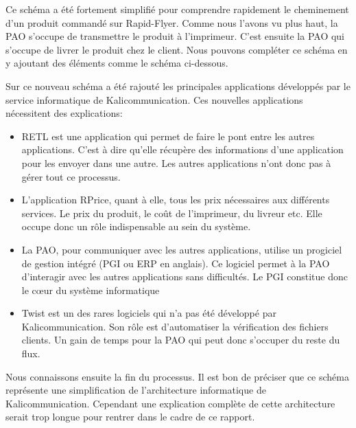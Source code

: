

Ce schéma a été fortement simplifié pour comprendre rapidement le cheminement d'un produit commandé sur Rapid-Flyer. Comme nous l'avons vu plus haut, la PAO s'occupe de transmettre le produit à l'imprimeur. C'est ensuite la PAO qui s'occupe de livrer le produit chez le client. Nous pouvons compléter ce schéma en y ajoutant des éléments comme le schéma ci-dessous.



Sur ce nouveau schéma a été rajouté les principales applications développés par le service informatique de Kalicommunication. Ces nouvelles applications nécessitent des explications:
\begin{itemize}
\item RETL est une application qui permet de faire le pont entre les autres applications. C'est à dire qu'elle récupère des informations d'une application pour les envoyer dans une autre. Les autres applications n'ont donc pas à gérer tout ce processus.
\item L'application RPrice, quant à elle, tous les prix nécessaires aux différents services. Le prix du produit, le coût de l'imprimeur, du livreur etc. Elle occupe donc un rôle indispensable au sein du système.
\item La PAO, pour communiquer avec les autres applications, utilise un progiciel de gestion intégré (PGI ou ERP en anglais). Ce logiciel permet à la PAO d'interagir avec les autres applications sans difficultés. Le PGI constitue donc le cœur du système informatique
\item Twist est un des rares logiciels qui n'a pas été développé par Kalicommunication. Son rôle est d'automatiser la vérification des fichiers clients. Un gain de temps pour la PAO qui peut donc s'occuper du reste du flux.\newline
\end{itemize}
Nous connaissons ensuite la fin du processus. Il est bon de préciser que ce schéma représente une simplification de l'architecture informatique de Kalicommunication. Cependant une explication complète de cette architecture serait trop longue pour rentrer dans le cadre de ce rapport.
